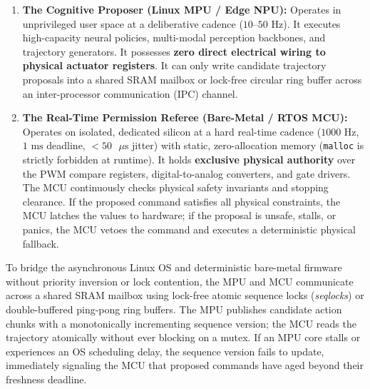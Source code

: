 \documentclass[
  10pt,
  letterpaper,
  twoside,
  openright,
  numbers=noenddot,
  headings=standardclasses
]{scrbook}
\begin{document}
\begin{enumerate}
\def\labelenumi{\arabic{enumi}.}
\tightlist
\item
  \textbf{The Cognitive Proposer (Linux MPU / Edge NPU):} Operates in
  unprivileged user space at a deliberative cadence
  (\(10\text{--}50\text{ Hz}\)). It executes high-capacity neural
  policies, multi-modal perception backbones, and trajectory generators.
  It possesses \textbf{zero direct electrical wiring to physical
  actuator registers}. It can only write candidate trajectory proposals
  into a shared SRAM mailbox or lock-free circular ring buffer across an
  inter-processor communication (IPC) channel.
\item
  \textbf{The Real-Time Permission Referee (Bare-Metal / RTOS MCU):}
  Operates on isolated, dedicated silicon at a hard real-time cadence
  (\(1000\text{ Hz}\), \(1\text{ ms}\) deadline,
  \(< 50\text{ }\mu\text{s}\) jitter) with static, zero-allocation
  memory (\texttt{malloc} is strictly forbidden at runtime). It holds
  \textbf{exclusive physical authority} over the PWM compare registers,
  digital-to-analog converters, and gate drivers. The MCU continuously
  checks physical safety invariants and stopping clearance. If the
  proposed command satisfies all physical constraints, the MCU latches
  the values to hardware; if the proposal is unsafe, stalls, or panics,
  the MCU vetoes the command and executes a deterministic physical
  fallback.
\end{enumerate}

To bridge the asynchronous Linux OS and deterministic bare-metal
firmware without priority inversion or lock contention, the MPU and MCU
communicate across a shared SRAM mailbox using lock-free atomic sequence
locks (\emph{seqlocks}) or double-buffered ping-pong ring
buffers. The MPU publishes
candidate action chunks with a monotonically incrementing sequence
version; the MCU reads the trajectory atomically without ever blocking
on a mutex. If an MPU core stalls or experiences an OS scheduling delay,
the sequence version fails to update, immediately signaling the MCU that
proposed commands have aged beyond their freshness deadline.
\end{document}

